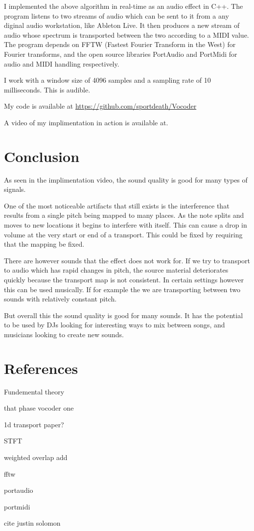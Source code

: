 \documentclass[12pt]{article}
\begin{document}
I implemented the above algorithm in real-time as an audio effect in C++.
The program listens to two streams of audio
which can be sent to it from a any diginal audio workstation, like Ableton Live.
It then produces a new stream of audio 
whose spectrum is transported between the two
according to a MIDI value.
The program depends on FFTW (Fastest Fourier Transform in the West) for Fourier transforms, and the open source libraries PortAudio and PortMidi for audio and MIDI handling respectively.

I work with a window size of 4096 samples and a sampling rate of 10 milliseconds. This is audible. 

My code is available at
\url{https://github.com/sportdeath/Vocoder}

A video of my implimentation in action is available at.

\section{Conclusion}

As seen in the implimentation video, the sound quality is good for many types of signals.

One of the most noticeable artifacts that still exists is the interference that results from a single pitch being mapped to many places.
As the note splits and moves to new locations it begins to interfere with itself.
This can cause a drop in volume at the very start or end of a transport.
This could be fixed by requiring that the mapping be fixed.

There are however sounds that the effect does not work for.
If we try to transport to audio which has rapid changes in pitch, the source material deteriorates quickly because the transport map is not consistent.
In certain settings however this can be used musically.
If for example the we are transporting between two sounds with relatively constant pitch.

But overall this the sound quality is good for many sounds.
It has the potential to be used by DJs looking for interesting ways to mix between songs, and musicians looking to create new sounds.

\section{References}

Fundemental theory

that phase vocoder one

1d transport paper?

STFT

weighted overlap add

fftw

portaudio

portmidi

cite justin solomon
\end{document}
